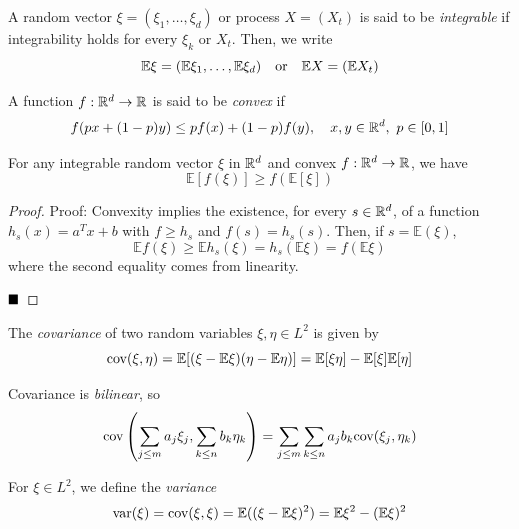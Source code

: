 
\begin{definition}
    A random vector $\xi = (\xi_1, \ldots, \xi_d)$ or process $X = (X_t)$ is said to be \emph{integrable} if integrability holds for every $\xi_k$ or $X_t$. Then, we write
    \[ \mathbb{E}\xi = (\mathbb{E}\xi_1, \ldots, \mathbb{E}\xi_d) \quad \tt{or} \quad \mathbb{E}X = (\mathbb{E}X_t) \]
\end{definition}

\begin{definition}
    A function $f : \R^d \to \R$ is said to be \emph{convex} if
    \[ f(px + (1 - p)y) \leq pf(x) + (1 - p)f(y), \quad x, y \in \R^d,\ p \in [0, 1] \]
\end{definition}


\begin{theorem}
    For any integrable random vector $\xi$ in $\R^d$ and convex $f : \R^d \to \R$, we have
    \[ \mathbb{E}[f(\xi)] \geq f(\mathbb{E}[\xi]) \]
\end{theorem}
\begin{proof}{Proof:}
    Convexity implies the existence, for every $s \in \R^d$, of a function $h_s(x) = a^{T}x + b$ with $f \geq h_s$ and $f(s) = h_s(s)$. Then, if $s = \mathbb{E}(\xi)$,
    \[ \mathbb{E}f(\xi) \geq \mathbb{E}h_s(\xi) = h_s(\mathbb{E}\xi) = f(\mathbb{E}\xi) \]
    where the second equality comes from linearity.

    $\qed$
\end{proof}

\begin{definition}
    The \emph{covariance} of two random variables $\xi, \eta \in L^2$ is given by
    \[ \tt{cov}(\xi, \eta) = \mathbb{E}[(\xi - \mathbb{E}\xi)(\eta - \mathbb{E}\eta)] = \mathbb{E}[\xi\eta] - \mathbb{E}[\xi]\mathbb{E}[\eta] \]
\end{definition}

Covariance is \emph{bilinear}, so
\[ \tt{cov}\left(\sum_{j \leq m} a_j\xi_j, \sum_{k \leq n} b_k\eta_k\right) = \sum_{j \leq m}\sum_{k \leq n} a_jb_k\tt{cov}(\xi_j, \eta_k) \]

\begin{definition}
    For $\xi \in L^2$, we define the \emph{variance}
    \[ \tt{var}(\xi) = \tt{cov}(\xi, \xi) = \mathbb{E}((\xi - \mathbb{E}\xi)^2) = \mathbb{E}\xi^2 - (\mathbb{E}\xi)^2 \]
\end{definition}

